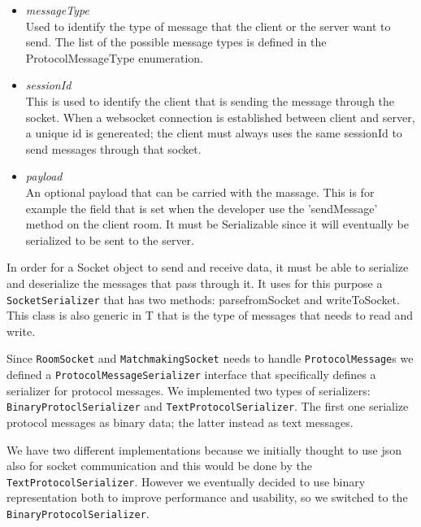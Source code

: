 \begin{itemize}
	\item \textit{messageType} \\
	Used to identify the type of message that the client or the server want to send. The list of the possible message types is defined in the ProtocolMessageType enumeration.
	\item \textit{sessionId} \\
	This is used to identify the client that is sending the message through the socket. When a websocket connection is established between client and server, a unique id is genereated; the client must always uses the same sessionId to send messages through that socket.
	\item \textit{payload} \\ 
	An optional payload that can be carried with the massage. This is for example the field that is set when the developer use the 'sendMessage' method on the client room. It must be Serializable since it will eventually be serialized to be sent to the server.
\end{itemize}

In order for a Socket object to send and receive data, it must be able to serialize and deserialize the messages that pass through it. It uses for this purpose a \texttt{SocketSerializer} that has two methods: parsefromSocket and writeToSocket. This class is also generic in T that is the type of messages that needs to read and write.

Since \texttt{RoomSocket} and \texttt{MatchmakingSocket} needs to handle \texttt{ProtocolMessage}s we defined a \texttt{ProtocolMessageSerializer} interface that specifically defines a serializer for protocol messages. We implemented two types of serializers: \texttt{BinaryProtoclSerializer} and \texttt{TextProtocolSerializer}. The first one serialize protocol messages as binary data; the latter instead as text messages.
 
We have two different implementations because we initially thought to use json also for socket communication and this would be done by the \texttt{TextProtocolSerializer}. However we eventually decided to use binary representation both to improve performance and usability, so we switched to the \texttt{BinaryProtocolSerializer}.


